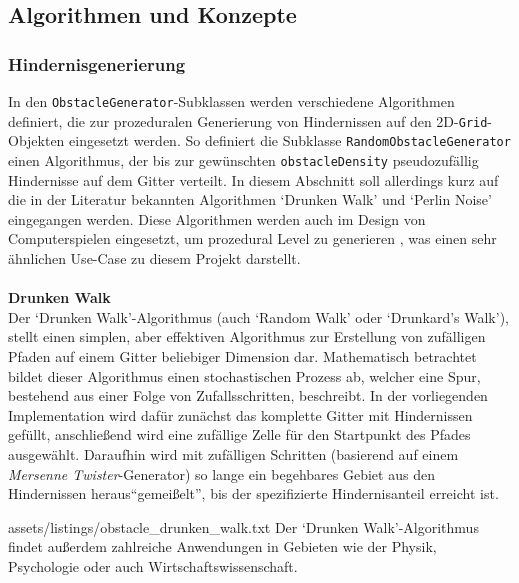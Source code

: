 \subsection{Algorithmen und Konzepte}
\label{subsec:aufbau_backend_konzepte}
\subsubsection{Hindernisgenerierung}
In den \texttt{ObstacleGenerator}-Subklassen werden verschiedene Algorithmen definiert, die zur prozeduralen Generierung von
Hindernissen auf den 2D-\texttt{Grid}-Objekten eingesetzt werden.
So definiert die Subklasse \texttt{RandomObstacleGenerator} einen Algorithmus, der bis zur gewünschten \texttt{obstacleDensity}
pseudozufällig Hindernisse auf dem Gitter verteilt.
In diesem Abschnitt soll allerdings kurz auf die in der Literatur bekannten Algorithmen `Drunken Walk' und `Perlin Noise' eingegangen werden.
Diese Algorithmen werden auch im Design von Computerspielen eingesetzt, um prozedural Level zu generieren \cite{koesnaedi2022, andrian2023},
was einen sehr ähnlichen Use-Case zu diesem Projekt darstellt.\\\\

\textbf{Drunken Walk}\\
Der `Drunken Walk'-Algorithmus (auch `Random Walk' oder `Drunkard's Walk'), stellt einen simplen, aber effektiven Algorithmus
zur Erstellung von zufälligen Pfaden auf einem Gitter beliebiger Dimension dar.
Mathematisch betrachtet bildet dieser Algorithmus einen stochastischen Prozess ab, welcher eine Spur, bestehend aus
einer Folge von Zufallsschritten, beschreibt. \cite{pearson1905}
In der vorliegenden Implementation wird dafür zunächst das komplette Gitter mit Hindernissen gefüllt, anschließend wird
eine zufällige Zelle für den Startpunkt des Pfades ausgewählt.
Daraufhin wird mit zufälligen Schritten (basierend auf einem \textit{Mersenne Twister}-Generator) so lange ein begehbares Gebiet aus den Hindernissen heraus``gemeißelt'', bis der
spezifizierte Hindernisanteil erreicht ist.

    {assets/listings/obstacle_drunken_walk.txt}
Der `Drunken Walk'-Algorithmus findet außerdem zahlreiche Anwendungen in Gebieten wie der Physik, Psychologie oder auch Wirtschaftswissenschaft. \cite{weiss1982, nosofsky1997, kodde1984}\\\\

